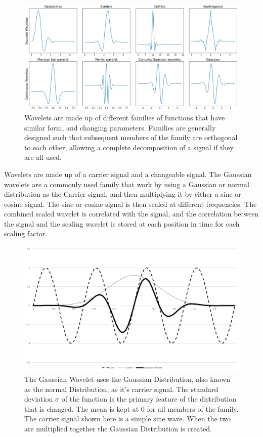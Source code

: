 \documentclass[journal=jacsat,manuscript=article]{achemso}
\begin{document}
\begin{figure}
	\centering
	\includegraphics[width=0.7\linewidth]{"Figures/wavelet_families"}
	\caption[Wavelet Families]{Wavelets are made up of different families of functions that have similar form, and changing parameters.  Families are generally designed such that subsequent members of the family are orthogonal to each other, allowing a complete decomposition of a signal if they are all used.}
	\label{fig:wavelet_families}
\end{figure}
Wavelets are made up of a carrier signal and a changeable signal.  The Gaussian wavelets are a commonly used family that work by using a Gaussian or normal distribution as the Carrier signal, and then multiplying it by either a sine or cosine signal.  The sine or cosine signal is then scaled at different frequencies.  The combined scaled wavelet is correlated with the signal, and the correlation between the signal and the scaling wavelet is stored at each position in time for each scaling factor.

\begin{figure}
	\centering
	\includegraphics[width=0.7\linewidth]{"Figures/Gassian Wavelet with Carrier"}
	\caption[Gaussian Wavelet]{The Gaussian Wavelet uses the Gaussian Distribution, also known as the normal Distribution, as it's carrier signal.  The standard deviation $\sigma$ of the function is the primary feature of the distribution that is changed.  The mean is kept at 0 for all members of the family.  The carrier signal shown here is a simple sine wave.  When the two are multiplied together the Gaussian Distribution is created.}
	\label{fig:gaussian_wavelet}
\end{figure}
\end{document}
